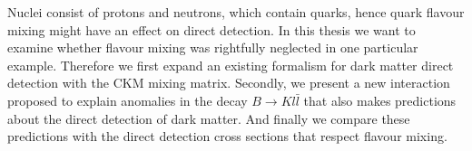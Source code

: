 

Nuclei consist of protons and neutrons, which contain quarks, hence quark flavour mixing might have an effect on direct detection. In this thesis we want to examine whether flavour mixing was rightfully neglected in one particular example. Therefore we first expand an existing formalism for dark matter direct detection with the CKM mixing matrix. Secondly, we present a new interaction proposed to explain anomalies in the decay $B\rightarrow Kl\bar{l}$ that also makes predictions about the direct detection of dark matter. And finally we compare these predictions with the direct detection cross sections that respect flavour mixing.


%	
